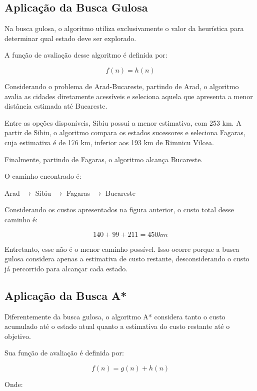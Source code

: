 \subsection{Aplicação da Busca Gulosa}

Na busca gulosa, o algoritmo utiliza exclusivamente o valor da heurística para determinar qual estado deve ser explorado.

A função de avaliação desse algoritmo é definida por:

\begin{equation}
	f(n) = h(n)
\end{equation}

Considerando o problema de Arad-Bucareste, partindo de Arad, o algoritmo avalia as cidades diretamente acessíveis e seleciona aquela que apresenta a menor distância estimada até Bucareste.

Entre as opções disponíveis, Sibiu possui a menor estimativa, com 253 km. A partir de Sibiu, o algoritmo compara os estados sucessores e seleciona Fagaras, cuja estimativa é de 176 km, inferior aos 193 km de Rimnicu Vilcea.

Finalmente, partindo de Fagaras, o algoritmo alcança Bucareste.

O caminho encontrado é:

\begin{center}
	Arad $\rightarrow$ Sibiu $\rightarrow$ Fagaras $\rightarrow$ Bucareste
\end{center}

Considerando os custos apresentados na figura anterior, o custo total desse caminho é:


\[140 + 99 + 211 = 450 km\]


Entretanto, esse não é o menor caminho possível. Isso ocorre porque a busca gulosa considera apenas a estimativa de custo restante, desconsiderando o custo já percorrido para alcançar cada estado.

\subsection{Aplicação da Busca A*}

Diferentemente da busca gulosa, o algoritmo A* considera tanto o custo acumulado até o estado atual quanto a estimativa do custo restante até o objetivo.

Sua função de avaliação é definida por:

\[f(n) = g(n) + h(n)\]


Onde:

